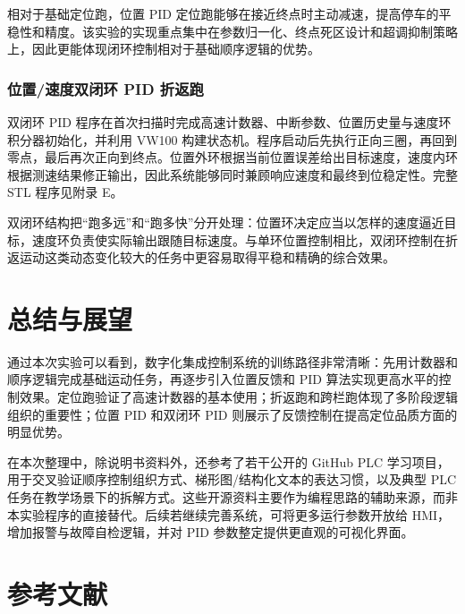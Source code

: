 \documentclass[12pt,a4paper]{ctexart}
\begin{document}
相对于基础定位跑，位置 PID 定位跑能够在接近终点时主动减速，提高停车的平稳性和精度。该实验的实现重点集中在参数归一化、终点死区设计和超调抑制策略上，因此更能体现闭环控制相对于基础顺序逻辑的优势。

\subsubsection{位置/速度双闭环 PID 折返跑}
双闭环 PID 程序在首次扫描时完成高速计数器、中断参数、位置历史量与速度环积分器初始化，并利用 VW100 构建状态机。程序启动后先执行正向三圈，再回到零点，最后再次正向到终点。位置外环根据当前位置误差给出目标速度，速度内环根据测速结果修正输出，因此系统能够同时兼顾响应速度和最终到位稳定性。完整 STL 程序见附录 E。

双闭环结构把“跑多远”和“跑多快”分开处理：位置环决定应当以怎样的速度逼近目标，速度环负责使实际输出跟随目标速度。与单环位置控制相比，双闭环控制在折返运动这类动态变化较大的任务中更容易取得平稳和精确的综合效果。

\section{总结与展望}
通过本次实验可以看到，数字化集成控制系统的训练路径非常清晰：先用计数器和顺序逻辑完成基础运动任务，再逐步引入位置反馈和 PID 算法实现更高水平的控制效果。定位跑验证了高速计数器的基本使用；折返跑和跨栏跑体现了多阶段逻辑组织的重要性；位置 PID 和双闭环 PID 则展示了反馈控制在提高定位品质方面的明显优势。

在本次整理中，除说明书资料外，还参考了若干公开的 GitHub PLC 学习项目，用于交叉验证顺序控制组织方式、梯形图/结构化文本的表达习惯，以及典型 PLC 任务在教学场景下的拆解方式。这些开源资料主要作为编程思路的辅助来源，而非本实验程序的直接替代。后续若继续完善系统，可将更多运行参数开放给 HMI，增加报警与故障自检逻辑，并对 PID 参数整定提供更直观的可视化界面。

\section*{参考文献}
\end{document}
